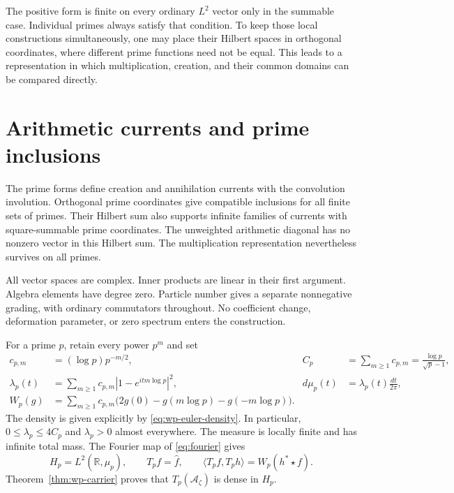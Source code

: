 \documentclass[11pt]{article}
\theoremstyle{definition}
\theoremstyle{remark}
\numberwithin{equation}{section}
\newcommand{\cA}{\mathcal A}
\newcommand{\R}{\mathbb R}
\begin{document}
The positive form is finite on every ordinary $L^2$ vector only in the
summable case.  Individual primes always satisfy that condition.  To keep
those local constructions simultaneously, one may place their Hilbert
spaces in orthogonal coordinates, where different prime functions need
not be equal.  This leads to a representation in which multiplication,
creation, and their common domains can be compared directly.

\section{Arithmetic currents and prime inclusions}
\label{sec:wc-currents}

The prime forms define creation and annihilation currents with the convolution involution.  Orthogonal prime coordinates give compatible
inclusions for all finite sets of primes.  Their Hilbert sum also supports
infinite families of currents with square-summable prime coordinates.
The unweighted arithmetic diagonal has no nonzero vector in this Hilbert
sum.  The multiplication representation nevertheless survives on all primes.

All vector spaces are complex.  Inner products are linear in their first
argument.  Algebra elements have degree zero.  Particle number gives a
separate nonnegative grading, with ordinary commutators throughout.
No coefficient change, deformation parameter, or zero spectrum enters
the construction.

For a prime $p$, retain every power $p^m$ and set
\begin{equation}
 \begin{aligned}
 c_{p,m}&=(\log p)p^{-m/2},&
 C_p&=\sum_{m\geq1}c_{p,m}=\frac{\log p}{\sqrt p-1},\\
 \lambda_p(t)&=\sum_{m\geq1}c_{p,m}|1-e^{itm\log p}|^2,&
 d\mu_p(t)&=\lambda_p(t)\frac{dt}{2\pi},\\
 W_p(g)&=\sum_{m\geq1}c_{p,m}
 \bigl(2g(0)-g(m\log p)-g(-m\log p)\bigr).
 \end{aligned}
 \label{eq:wc-local-data}
\end{equation}
The density is given explicitly by \eqref{eq:wp-euler-density}.
In particular, $0\leq\lambda_p\leq4C_p$ and $\lambda_p>0$ almost
everywhere.  The measure is locally finite and has infinite total mass.
The Fourier map of \eqref{eq:fourier} gives
\[
 H_p=L^2(\R,\mu_p),\qquad
 T_p f=\widehat f,\qquad
 \langle T_pf,T_ph\rangle=W_p(h^*\star f).
\]
Theorem~\ref{thm:wp-carrier} proves that $T_p(\cA_\zeta)$ is dense in $H_p$.
\end{document}
